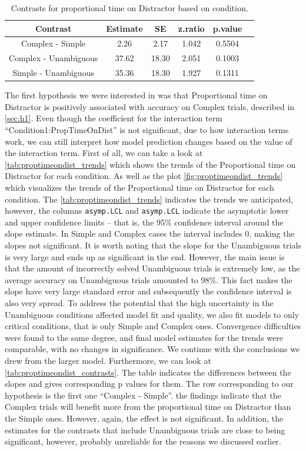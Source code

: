 \begin{table}[h!]
\centering
\begin{tabular}{|c|c|c|c|c|c|}
\hline
\textbf{Contrast} & \textbf{Estimate} & \textbf{SE} & \textbf{z.ratio} & \textbf{p.value} \\ \hline
Complex - Simple & 2.26 & 2.17 & 1.042 & 0.5504 \\ \hline
Complex - Unambiguous & 37.62 & 18.30 & 2.051 & 0.1003 \\ \hline
Simple - Unambiguous & 35.36 & 18.30 & 1.927 & 0.1311 \\ \hline
\end{tabular}
\caption{Contrasts for proportional time on Distractor based on condition.}
\label{tab:proptimeondist_contrasts}
\end{table}

The first hypothesis we were interested in was that Proportional time on Distractor is positively associated with accuracy on Complex trials, described in \autoref{sec:h1}. Even though the coefficient for the interaction term ``Condition1:PropTimeOnDist'' is not significant, due to how interaction terms work, we can still interpret how model prediction changes based on the value of the interaction term. First of all, we can take a look at \autoref{tab:proptimeondist_trends} which shows the trends of the Proportional time on Distractor for each condition. As well as the plot \autoref{fig:proptimeondist_trends} which visualizes the trends of the Proportional time on Distractor for each condition. The \autoref{tab:proptimeondist_trends} indicates the trends we anticipated, however, the columns \texttt{asymp.LCL} and \texttt{asymp.LCL} indicate the asymptotic lower and upper confidence limits -- that is, the 95\% confidence interval around the slope estimate. In Simple and Complex cases the interval includes 0, making the slopes not significant. It is worth noting that the slope for the Unambiguous trials is very large and ends up as significant in the end. However, the main issue is that the amount of incorrectly solved Unambiguous trials is extremely low, as the average accuracy on Unambiguous trials amounted to 98\%. This fact makes the slope have very large standard error and subsequently the confidence interval is also very spread. To address the potential that the high uncertainty in the Unambiguous conditions affected model fit and quality, we also fit models to only critical conditions, that is only Simple and Complex ones. Convergence difficulties were found to the same degree, and final model estimates for the trends were comparable, with no changes in significance. We continue with the conclusions we drew from the larger model.
Furthermore, we can look at \autoref{tab:proptimeondist_contrasts}. The table indicates the differences between the slopes and gives corresponding p values for them. The row corresponding to our hypothesis is the first one ``Complex - Simple''. the findings indicate that the Complex trials will benefit more from the proportional time on Distractor than the Simple ones. However, again, the effect is not significant. In addition, the estimates for the contrasts that include Unambiguous trials are close to being significant, however, probably unreliable for the reasons we discussed earlier.

